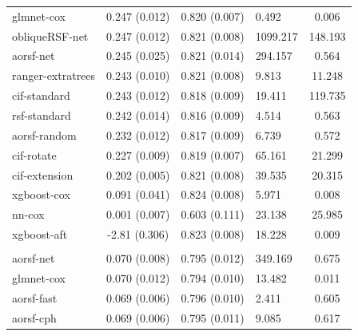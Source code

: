 \documentclass[twoside,11pt]{article}\usepackage[]{graphicx}\usepackage[]{xcolor}
\newenvironment{knitrout}{}{} %
\begin{document}
\begin{knitrout}
\begin{longtable}[t]{lcclc}
\hspace{1em}glmnet-cox & 0.247 (0.012) & 0.820 (0.007) & 0.492 & 0.006\\
\hspace{1em}obliqueRSF-net & 0.247 (0.012) & 0.821 (0.008) & 1099.217 & 148.193\\
\hspace{1em}aorsf-net & 0.245 (0.025) & 0.821 (0.014) & 294.157 & 0.564\\
\hspace{1em}ranger-extratrees & 0.243 (0.010) & 0.821 (0.008) & 9.813 & 11.248\\
\hspace{1em}cif-standard & 0.243 (0.012) & 0.818 (0.009) & 19.411 & 119.735\\
\hspace{1em}rsf-standard & 0.242 (0.014) & 0.816 (0.009) & 4.514 & 0.563\\
\hspace{1em}aorsf-random & 0.232 (0.012) & 0.817 (0.009) & 6.739 & 0.572\\
\hspace{1em}cif-rotate & 0.227 (0.009) & 0.819 (0.007) & 65.161 & 21.299\\
\hspace{1em}cif-extension & 0.202 (0.005) & 0.821 (0.008) & 39.535 & 20.315\\
\hspace{1em}xgboost-cox & 0.091 (0.041) & 0.824 (0.008) & 5.971 & 0.008\\
\hspace{1em}nn-cox & 0.001 (0.007) & 0.603 (0.111) & 23.138 & 25.985\\
\hspace{1em}xgboost-aft & -2.81 (0.306) & 0.823 (0.008) & 18.228 & 0.009\\
\addlinespace[0.3em]
\hline
\multicolumn{5}{l}{\textit{\textbf{SPRINT; CVD death, n = 9361, p = 174}}}\\
\hline
\hspace{1em}aorsf-net & 0.070 (0.008) & 0.795 (0.012) & 349.169 & 0.675\\
\hspace{1em}glmnet-cox & 0.070 (0.012) & 0.794 (0.010) & 13.482 & 0.011\\
\hspace{1em}aorsf-fast & 0.069 (0.006) & 0.796 (0.010) & 2.411 & 0.605\\
\hspace{1em}aorsf-cph & 0.069 (0.006) & 0.795 (0.011) & 9.085 & 0.617\\

\end{longtable}
\end{knitrout}
\end{document}
